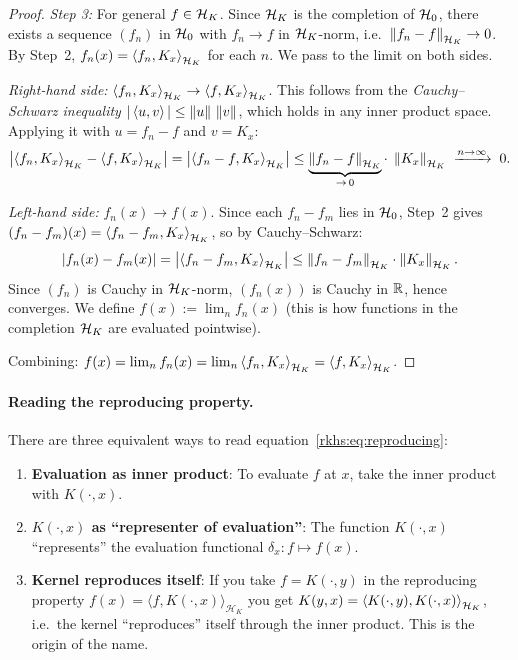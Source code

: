\begin{notechapter}
\begin{proof}
\emph{Step 3:} For general $f \in \mathcal{H}_K$. Since $\mathcal{H}_K$
is the completion of $\mathcal{H}_0$, there exists a
sequence $(f_n)$ in $\mathcal{H}_0$ with
$f_n \to f$ in $\mathcal{H}_K$-norm, i.e.\
$\left\|f_n - f\right\|_{\mathcal{H}_K} \to 0$. By Step~2,
$f_n(x) = \left\langle f_n, K_x \right\rangle_{\mathcal{H}_K}$ for each $n$.
We pass to the limit on both sides.

\emph{Right-hand side:}
$\left\langle f_n, K_x \right\rangle_{\mathcal{H}_K} \to \left\langle f, K_x \right\rangle_{\mathcal{H}_K}$.
This follows from the \emph{Cauchy--Schwarz
inequality} $|\left\langle u, v \right\rangle| \leq \left\|u\right\|\,\left\|v\right\|$,
which holds in any inner product space. Applying it
with $u = f_n - f$ and $v = K_x$:
\[
\bigl|\left\langle f_n, K_x \right\rangle_{\mathcal{H}_K}
  - \left\langle f, K_x \right\rangle_{\mathcal{H}_K}\bigr|
= \bigl|\left\langle f_n - f, K_x \right\rangle_{\mathcal{H}_K}\bigr|
\leq \underbrace{\left\|f_n - f\right\|_{\mathcal{H}_K}}_{\to\, 0}
  \cdot\; \left\|K_x\right\|_{\mathcal{H}_K}
\;\xrightarrow{n \to \infty}\; 0.
\]

\emph{Left-hand side:}
$f_n(x) \to f(x)$. Since each $f_n - f_m$ lies in
$\mathcal{H}_0$, Step~2 gives
$(f_n - f_m)(x) = \left\langle f_n - f_m, K_x \right\rangle_{\mathcal{H}_K}$,
so by Cauchy--Schwarz:
\[
|f_n(x) - f_m(x)|
= \bigl|\left\langle f_n - f_m, K_x \right\rangle_{\mathcal{H}_K}\bigr|
\leq \left\|f_n - f_m\right\|_{\mathcal{H}_K} \cdot \left\|K_x\right\|_{\mathcal{H}_K}.
\]
Since $(f_n)$ is Cauchy in $\mathcal{H}_K$-norm,
$(f_n(x))$ is Cauchy in $\mathbb{R}$, hence converges.
We define $f(x) := \lim_n f_n(x)$ (this is how
functions in the completion $\mathcal{H}_K$ are evaluated
pointwise).

Combining: $f(x) = \lim_{n} f_n(x)
= \lim_{n} \left\langle f_n, K_x \right\rangle_{\mathcal{H}_K}
= \left\langle f, K_x \right\rangle_{\mathcal{H}_K}$.
\end{proof}

\paragraph{Reading the reproducing property.} There are three equivalent
ways to read equation~\eqref{rkhs:eq:reproducing}:
\begin{enumerate}[label=(\alph*)]
  \item \textbf{Evaluation as inner product}: To evaluate $f$ at $x$,
  take the inner product with $K(\cdot, x)$.
  \item \textbf{$K(\cdot, x)$ as ``representer of evaluation''}: The
  function $K(\cdot, x)$ ``represents'' the evaluation functional
  $\delta_x: f \mapsto f(x)$.
  \item \textbf{Kernel reproduces itself}: If you take $f = K(\cdot, y)$
  in the reproducing property
  $f(x) = \langle f, K(\cdot, x) \rangle_{\mathcal{H}_K}$
  you get $K(y,x) = \left\langle K(\cdot,y), K(\cdot,x) \right\rangle_{\mathcal{H}_K}$, i.e.\ the
  kernel ``reproduces'' itself through the inner product. This is the
  origin of the name.
\end{enumerate}


\end{notechapter}
